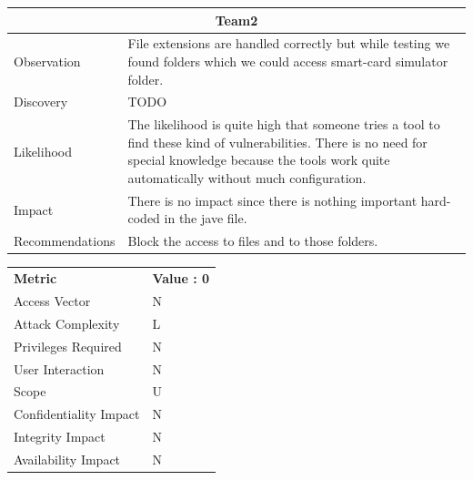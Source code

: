 \documentclass[headsepline,footsepline,footinclude=false,oneside,fontsize=11pt,paper=a4,listof=totoc,bibliography=totoc]{scrbook} %
\begin{document}
\begin{tabular}{ l|p{11cm}  }
	\hline
	\multicolumn{2}{c}{\textbf{Team2}} \\
	\hline
	Observation   & File extensions are handled correctly but while testing we found folders which we could access smart-card simulator folder.   \\
	Discovery  & TODO \\
	Likelihood & The likelihood is quite high that someone tries a tool to find these kind of vulnerabilities. There is no need for special knowledge because the tools work quite automatically without much configuration. \\
	Impact    & There is no impact since there is nothing important hard-coded in the jave file.\\
	Recommendations & Block the access to files and to those folders.\\ 
	\hline
\end{tabular}

\begin{center}
	\begin{tabular}{ll}
		\rowcolor[HTML]{34CDF9}
		{\color[HTML]{ECF4FF} \textbf{Metric}}        & {\color[HTML]{ECF4FF} \textbf{Value : 0}} \\
		\rowcolor[HTML]{BBDAFF}
		{\color[HTML]{333333} Access Vector}          & {\color[HTML]{333333} } N              \\
		\rowcolor[HTML]{ECF4FF}
		{\color[HTML]{333333} Attack Complexity}      & {\color[HTML]{333333} } L              \\
		\rowcolor[HTML]{BBDAFF}
		{\color[HTML]{333333} Privileges Required}    & {\color[HTML]{333333} } N              \\
		\rowcolor[HTML]{ECF4FF}
		{\color[HTML]{333333} User Interaction}       & {\color[HTML]{333333} } N              \\
		\rowcolor[HTML]{BBDAFF}
		{\color[HTML]{333333} Scope}                  & {\color[HTML]{333333} } U              \\
		\rowcolor[HTML]{ECF4FF}
		{\color[HTML]{333333} Confidentiality Impact} & {\color[HTML]{333333} } N              \\
		\rowcolor[HTML]{BBDAFF}
		{\color[HTML]{333333} Integrity Impact}       & {\color[HTML]{333333} } N              \\
		\rowcolor[HTML]{ECF4FF}
		{\color[HTML]{333333} Availability Impact}    & {\color[HTML]{333333} } N
	\end{tabular}
\end{center}
\pagebreak
\end{document}
